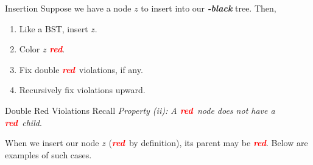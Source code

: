 \documentclass[aspectratio=169]{beamer}
\newcommand{\textib}[1]{\textit{\textbf{{#1}}}}
\newcommand{\red}{\textib{\textcolor{red}{red}}}
\begin{document}
\begin{frame}{Insertion}
    Suppose we have a node $z$ to insert into our \textib{\color{red}{red}}\textib{-black} tree. Then,
    \begin{enumerate}[label=\textit{(\roman*)}]
        \item<2-> Like a BST, insert $z$.
        \item<3-> Color $z$ \red.
        \item<4-> Fix double \red \ violations, if any.
        \item<5-> Recursively fix violations upward.
    \end{enumerate}
\end{frame}


\begin{frame}[fragile]{Double Red Violations}
    Recall \textit{Property (ii): A \red \ node does not have a \red \ child}. \vspace{1em}

    When we insert our node $z$ (\red \ by definition), its parent may be \red.
    Below are examples of such cases.
    \doublered
\end{frame}
\end{document}
